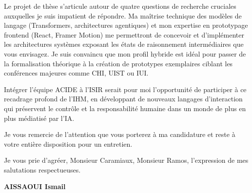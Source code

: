 \documentclass[a4paper,11pt]{article}
\begin{document}
Le projet de thèse s'articule autour de quatre questions de recherche cruciales auxquelles je suis impatient de répondre. Ma maîtrise technique des modèles de langage (Transformers, architectures agentiques) et mon expertise en prototypage frontend (React, Framer Motion) me permettront de concevoir et d'implémenter les architectures systèmes exposant les états de raisonnement intermédiaires que vous envisagez. Je suis convaincu que mon profil hybride est idéal pour passer de la formalisation théorique à la création de prototypes exemplaires ciblant les conférences majeures comme CHI, UIST ou IUI.

Intégrer l'équipe ACIDE à l'ISIR serait pour moi l'opportunité de participer à ce recadrage profond de l'IHM, en développant de nouveaux langages d'interaction qui préservent le contrôle et la responsabilité humaine dans un monde de plus en plus médiatisé par l'IA.

Je vous remercie de l'attention que vous porterez à ma candidature et reste à votre entière disposition pour un entretien.

Je vous prie d'agréer, Monsieur Caramiaux, Monsieur Ramos, l'expression de mes salutations respectueuses.

\vspace{0.4cm}

\begin{flushleft}
    \textbf{AISSAOUI Ismail}
\end{flushleft}
\end{document}
